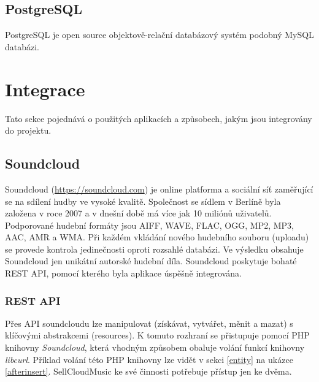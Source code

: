 \documentclass[12pt]{article}
\begin{document}
\subsection{PostgreSQL}
PostgreSQL je open source objektově-relační databázový systém podobný MySQL databázi.

\newpage

\section{Integrace}

Tato sekce pojednává o použitých aplikacích a způsobech, jakým jsou integrovány do projektu.

\subsection{Soundcloud}

Soundcloud (\url{https://soundcloud.com}) je online platforma a sociální síť zaměřující se na sdílení hudby ve vysoké kvalitě. Společnost se sídlem v Berlíně byla založena v roce 2007 a v dnešní době má více jak 10 miliónů uživatelů. Podporované hudební formáty jsou AIFF, WAVE, FLAC, OGG, MP2, MP3, AAC, AMR a WMA. Při každém vkládání nového hudebního souboru (uploadu) se provede kontrola jedinečnosti oproti rozsahlé databázi. Ve výsledku obsahuje Soundcloud jen unikátní autorské hudební díla. Soundcloud poskytuje bohaté REST API, pomocí kterého byla aplikace úspěšně integrována.

\subsubsection{REST API}

Přes API soundcloudu lze manipulovat (získávat, vytvářet, měnit a mazat) s klíčovými abstrakcemi (resources). K tomuto rozhraní se přistupuje pomocí PHP knihovny \emph{Soundcloud}, která vhodným způsobem obaluje volání funkcí knihovny \emph{libcurl}. Příklad volání této PHP knihovny lze vidět v sekci \ref{entity} na ukázce \ref{afterinsert}. SellCloudMusic ke své činnosti potřebuje přístup jen ke dvěma.
\end{document}
